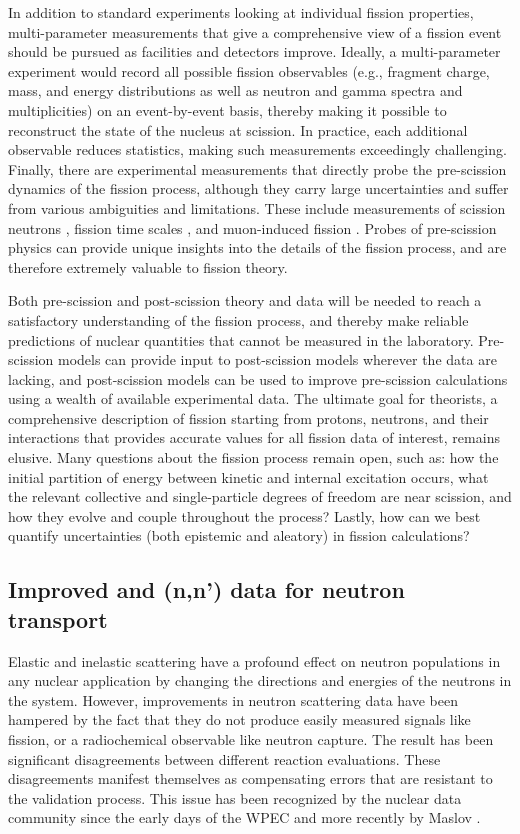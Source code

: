 \documentclass[letterpaper]{ar-1col}
\begin{document}
In addition to standard experiments looking at individual fission properties, multi-parameter measurements that give a comprehensive view of a fission event should be pursued as facilities and detectors improve. Ideally, a multi-parameter experiment would record all possible fission observables (e.g., fragment charge, mass, and energy distributions as well as neutron and gamma spectra and multiplicities) on an event-by-event basis, thereby making it possible to reconstruct the state of the nucleus at scission. In practice, each additional observable reduces statistics, making such measurements exceedingly challenging. Finally, there are experimental measurements that directly probe the pre-scission dynamics of the fission process, although they carry large uncertainties and suffer from various ambiguities and limitations. These include measurements of scission neutrons \cite{Pe09}, fission time scales \cite{Jac09}, and muon-induced fission \cite{Mar80}. Probes of pre-scission physics can provide unique insights into the details of the fission process, and are therefore extremely valuable to fission theory.

Both pre-scission and post-scission theory and data will be needed to reach a satisfactory understanding of the fission process, and thereby make reliable predictions of nuclear quantities that cannot be measured in the laboratory. Pre-scission models can provide input to post-scission models wherever the data are lacking, and post-scission models can be used to improve pre-scission calculations using a wealth of available experimental data. The ultimate goal for theorists, a comprehensive description of fission starting from protons, neutrons, and their interactions that provides accurate values for all fission data of interest, remains elusive.  Many questions about the fission process remain open, such as: how the initial partition of energy between kinetic and internal excitation occurs, what the relevant collective and single-particle degrees of freedom are near scission, and how they evolve and couple throughout the process? Lastly, how can we best quantify uncertainties (both epistemic and aleatory) in fission calculations?

\subsection{Improved  and (n,n') data for neutron transport}\label{sec:n_transport}

Elastic and inelastic scattering have a profound effect on neutron populations in any nuclear application by changing the directions and energies of the neutrons in the system.  However, improvements in neutron scattering data have been hampered by the fact that they do not produce easily measured signals like fission, or a radiochemical observable like neutron capture.  The result has been significant disagreements between different reaction evaluations.  These disagreements manifest themselves as compensating errors that are resistant to the validation process.  This issue has been recognized by the nuclear data community since the early days of the WPEC \cite{Row89} and more recently by Maslov \cite{Mas11}.  
\end{document}
